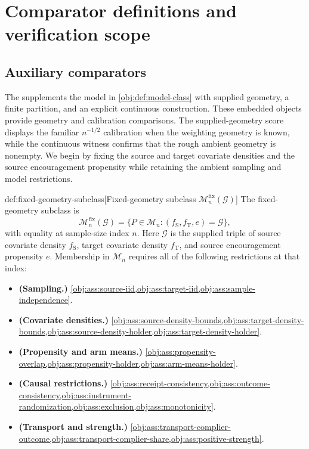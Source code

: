 \section{Comparator definitions and verification scope}
\label{sec:verification-appendix}

\subsection{Auxiliary comparators}

The  supplements the model in \cref{obj:def:model-class} with supplied geometry, a finite partition, and an explicit continuous construction. These embedded objects provide geometry and calibration comparisons. The supplied-geometry score displays the familiar \(n^{-1/2}\) calibration when the weighting geometry is known, while the continuous witness confirms that the rough ambient geometry is nonempty. We begin by fixing the source and target covariate densities and the source encouragement propensity while retaining the ambient sampling and model restrictions.

\begin{definitionv}{def:fixed-geometry-subclass}[Fixed-geometry subclass $\mathcal M_n^{\mathrm{fix}}(\mathcal G)$]
The fixed-geometry subclass is
\[
\mathcal M_n^{\mathrm{fix}}(\mathcal G)
=
\bigl\{P\in\mathcal M_n:(f_{\mathrm S},f_{\mathrm T},e)=\mathcal G\bigr\},
\]
with equality at sample-size index \(n\). Here \(\mathcal G\) is the supplied triple of source covariate density \(f_{\mathrm S}\), target covariate density \(f_{\mathrm T}\), and source encouragement propensity \(e\). Membership in \(\mathcal M_n\) requires all of the following restrictions at that index:
\begin{itemize}
\item \textbf{(Sampling.)} \cref{obj:ass:source-iid,obj:ass:target-iid,obj:ass:sample-independence}.
\item \textbf{(Covariate densities.)} \cref{obj:ass:source-density-bounds,obj:ass:target-density-bounds,obj:ass:source-density-holder,obj:ass:target-density-holder}.
\item \textbf{(Propensity and arm means.)} \cref{obj:ass:propensity-overlap,obj:ass:propensity-holder,obj:ass:arm-means-holder}.
\item \textbf{(Causal restrictions.)} \cref{obj:ass:receipt-consistency,obj:ass:outcome-consistency,obj:ass:instrument-randomization,obj:ass:exclusion,obj:ass:monotonicity}.
\item \textbf{(Transport and strength.)} \cref{obj:ass:transport-complier-outcome,obj:ass:transport-complier-share,obj:ass:positive-strength}.
\end{itemize}
\end{definitionv}

